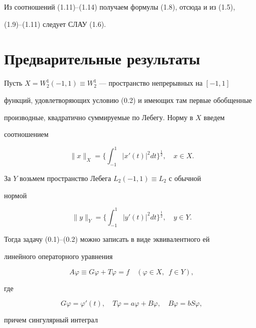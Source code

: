 Из соотношений (1.11)--(1.14) получаем формулы (1.8), отсюда и из (1.5),


(1.9)--(1.11) следует СЛАУ (1.6).





\section{Предварительные результаты}





Пусть $X=W_2^1(-1,1)\equiv W_2^1$ --- пространство непрерывных на $[-1,1]$ 


функций, удовлетворяющих условию (0.2) и имеющих там первые обобщенные


производные, квадратично суммируемые по Лебегу. Норму в $X$ введем


соотношением 


$$


\| x\|_X=\bigg\{\int_{-1}^1


| x'(t)|^2dt\bigg\}^{\frac{1}{2}},\quad x\in X.


$$


За $Y$ возьмем пространство Лебега $L_2(-1,1)\equiv L_2$ с обычной


нормой


$$


\| y\|_Y=\bigg\{\int_{-1}^1{| y'(t)|}^2dt


\bigg\}^{\frac{1}{2}},\quad y\in Y.


$$     


Тогда задачу (0.1)--(0.2) можно записать в виде эквивалентного ей 


линейного операторного уравнения


\begin{equation}


A\varphi\equiv G\varphi+T\varphi=f\quad (\varphi\in X,\ \;f\in Y),


\end{equation}


где 


\begin{equation}


G\varphi=\varphi'(t),\quad T\varphi=a\varphi+B\varphi,\quad


B\varphi=bS\varphi,


\end{equation}


причем сингулярный интеграл


